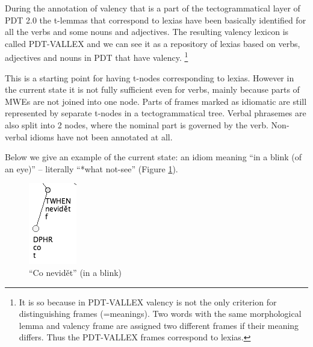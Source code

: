 \documentclass[11pt]{article}
\begin{document}
During the annotation of valency that is a part of the tectogrammatical layer of PDT 2.0  the t-lemmas that correspond to lexias have been basically identified for all the verbs and some nouns and adjectives.
The resulting valency lexicon is called PDT-VALLEX \cite{hajic:2003} and we can see it as a repository of lexias based on verbs, adjectives and nouns in PDT that have valency.
%
\footnote{It is so because in PDT-VALLEX valency is not the only criterion for distinguishing frames (=meanings). Two words with the same morphological lemma and valency frame are assigned two different frames if their meaning differs. Thus the PDT-VALLEX frames correspond to lexias.} 

This is a starting point for having t-nodes corresponding to lexias. However in the current state it is not fully sufficient even for verbs, mainly because parts of MWEs are not joined into one node. Parts of frames marked as idiomatic are still represented by separate t-nodes in a tectogrammatical tree. Verbal phrasemes are also split into 2 nodes, where the nominal part is governed by the verb. Non-verbal idioms have not been annotated at all. 

Below we give an example of the current state: an idiom meaning ``in a blink (of an eye)'' -- literally ``*what not-see'' (Figure \ref{fig:co-nevidet}).

\begin{figure}[htbp]
   \centering
   \includegraphics[width=.7in]{co-nevidet.png} 
   \caption{``Co nevidět'' (in a blink)}
   \label{fig:co-nevidet}
\end{figure}
%
\end{document}
